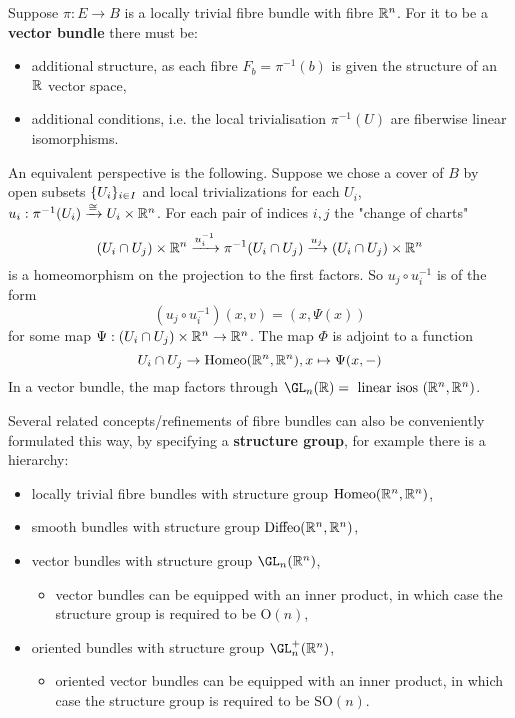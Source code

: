 \begin{remark}

Suppose $\pi:E\to B$ is a locally trivial fibre bundle with fibre ${\mathbb R}^n$. For it to be a \textbf{vector bundle} there must be:
\begin{itemize}[label={-}]
    \item additional structure, as each fibre $F_b=\pi^{-1}(b)$ is given the structure of an ${\mathbb R}$ vector space,
    \item  additional conditions, i.e. the local trivialisation $\pi^{-1}(U)$ are fiberwise linear isomorphisms.
\end{itemize}

An equivalent perspective is the following. Suppose we chose a cover of $B$ by open subsets $\{U_i\}_{i\in I}$ and local trivializations for each $U_i$, $u_i:\pi^{-1}(U_i)\xrightarrow{\cong} U_i\times{\mathbb R}^n$. For each pair of indices $i,j$ the "change of charts"
\[(U_i\cap U_j)\times{\mathbb R}^n\xrightarrow{u_i^{-1}}\pi^{-1}(U_i\cap U_j)\xrightarrow{u_j}(U_i\cap U_j)\times{\mathbb R}^n\]
is a homeomorphism on the projection to the first factors. So $u_j\circ u_i^{-1}$ is of the form
\[(u_j\circ u_i^{-1})(x,v)=(x,\Psi(x))\]
for some map $\Psi:(U_i\cap U_j)\times{\mathbb R}^n\to{\mathbb R}^n$. The map $\Phi$ is adjoint to a function
\[U_i\cap U_j\to\operatorname{Homeo}({\mathbb R}^n,{\mathbb R}^n), x\mapsto\Psi(x,-)\]
In a vector bundle, the map factors through $\GL_n(\R)=\text{ linear isos }(\R^n,\R^n)$.

Several related concepts/refinements of fibre bundles can also be conveniently formulated this way, by specifying a \textbf{structure group}, for example there is a hierarchy:
\begin{itemize}
    \item locally trivial fibre bundles with structure group $\operatorname{Homeo}({\mathbb R}^n,{\mathbb R}^n)$,
    \item smooth bundles with structure group $\operatorname{Diffeo}({\mathbb R}^n,{\mathbb R}^n)$,
    \item vector bundles with structure group $\GL_n(\R^n)$,
    \begin{itemize}
        \item vector bundles can be equipped with an inner product, in which case the structure group is required to be $\text{O}(n)$, 
    \end{itemize}
    \item oriented bundles with structure group $\GL_n^+(\R^n)$,
    \begin{itemize}
        \item oriented vector bundles can be equipped with an inner product, in which case the structure group is required to be $\text{SO}(n)$.
    \end{itemize}
\end{itemize}

\end{remark}

